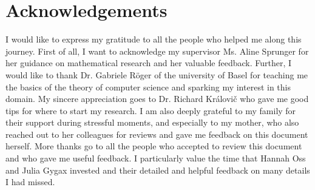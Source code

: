 \chapter*{Acknowledgements}

I would like to express my gratitude to all the people who helped me along this journey.
First of all, I want to acknowledge my supervisor Ms. Aline Sprunger for her guidance on mathematical research and her valuable feedback.
Further, I would like to thank Dr. Gabriele Röger of the university of Basel for teaching me the basics of the theory of computer science and sparking my interest in this domain.
My sincere appreciation goes to Dr. Richard Královi\v{c} who gave me good tips for where to start my research.
I am also deeply grateful to my family for their support during stressful moments, and especially to my mother, who also reached out to her colleagues for reviews and gave me feedback on this document herself.
More thanks go to all the people who accepted to review this document and who gave me useful feedback.
I particularly value the time that Hannah Oss and Julia Gygax invested and their detailed and helpful feedback on many details I had missed.